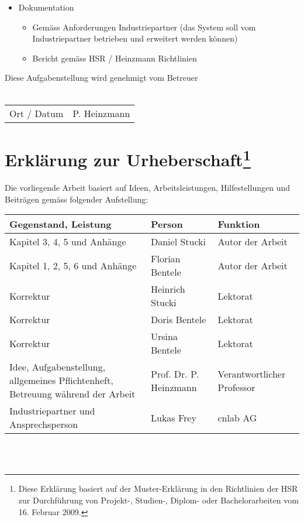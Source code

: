 \begin{itemize}
\item Dokumentation
\begin{itemize}
\item Gemäss Anforderungen Industriepartner (das System soll vom Industriepartner betrieben und erweitert werden können)
\item Bericht gemäss HSR / Heinzmann Richtlinien
\end{itemize}
\end{itemize}

Diese Aufgabenstellung wird genehmigt vom Betreuer
\\
\\

\begin{tabular}{p{3cm}p{4cm}}
\hline
Ort / Datum & P. Heinzmann
\end{tabular}

\section*{Erklärung zur Urheberschaft\footnote{Diese Erklärung basiert auf der Muster-Erklärung in den Richtlinien der HSR zur Durchführung von Projekt-, Studien-, Diplom- oder Bachelorarbeiten vom 16. Februar 2009.}}
Die vorliegende Arbeit basiert auf Ideen, Arbeitsleistungen, Hilfestellungen und Beiträgen gemäss folgender Aufstellung:
\\

\begin{tabular}{|m{5cm}|m{3.7cm}|m{3cm}|}
\hline
Gegenstand, Leistung & Person & Funktion \\[5pt]\hline\hline
Kapitel 3, 4, 5 und Anhänge & Daniel Stucki & Autor der Arbeit\\[5pt]\hline
Kapitel 1, 2, 5, 6 und Anhänge & Florian Bentele & Autor der Arbeit\\[5pt]\hline
Korrektur & Heinrich Stucki & Lektorat \\[5pt]\hline
Korrektur & Doris Bentele & Lektorat \\[5pt]\hline
Korrektur & Ursina Bentele & Lektorat \\[5pt]\hline
Idee, Aufgabenstellung, allgemeines Pflichtenheft, Betreuung während der Arbeit & Prof. Dr. P. Heinzmann & Verantwortlicher Professor \\[5pt]\hline
Industriepartner und Ansprechsperson & Lukas Frey & cnlab AG \\[5pt]\hline
\end{tabular}
\\
\\

